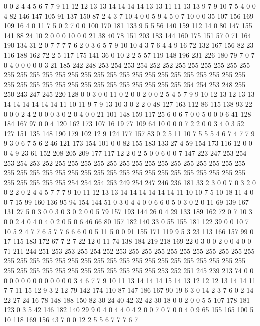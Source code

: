 0 0 2 4 4 5 6 7 7 9 11 12 12 13 13 14 14 14 14 13
13 11 11 13 13 9 7 9 10 7 5 4 0 0 4 82 146 147 105 91
137 150 87 2 4 3 7 10 4 0 0 5 9 4 5 0 7 10 0 0
35 107 156 169 109 16 4 0 11 7 5 0 2 7 0 0 100 170 181 133
9 5 5 56 140 159 112 14 0 80 147 155 141 88 24 10 2 0 0 0
10 0 0 21 38 40 78 151 203 183 144 160 175 151 57 0 71 164 190 134
31 2 0 7 7 7 7 6 2 0 3 6 5 7 9 10 10 4 3 7
6 4 4 9 16 72 132 167 156 82 23 116 188 162 72 2 5 117 175 141
36 0 10 2 2 5 57 119 148 196 231 226 180 79 7 0 7 0 4 0
0 0 0 0 3 21 185 242 248 253 254 253 254 252 252 255 255 255 255 255
255 255 255 255 255 255 255 255 255 255 255 255 255 255 255 255 255 255 255 255
255 255 255 255 255 255 255 255 255 255 255 255 255 255 254 254 253 248 255 250
243 247 245 220 128 0 0 3 0 0 11 0 2 0 0 2 0 0 2 5
4 5 7 9 9 10 12 13 12 13 13 14 14 14 14 14 14 11 10 11
9 7 9 13 10 3 0 2 2 0 48 127 163 112 86 115 138 93 22 0
0 0 2 4 2 0 0 0 3 0 2 0 4 0 0 21 101 148 159 117
25 6 0 6 7 0 0 5 0 0 0 6 41 128 184 167 97 0 0 4
120 162 173 107 16 19 77 109 64 10 0 0 0 7 2 2 0 0 3 4
0 3 52 127 151 135 148 190 179 102 12 9 124 177 157 83 0 2 5 11
10 7 5 5 5 4 6 7 4 7 7 9 9 3 0 6 7 5 6 2
46 121 173 154 101 0 0 82 155 183 133 27 4 59 154 173 116 12 0 0
0 4 9 23 61 152 208 205 209 177 117 12 2 0 2 5 0 0 6 0
0 7 147 223 247 253 254 253 254 253 252 255 255 255 255 255 255 255 255 255
255 255 255 255 255 255 255 255 255 255 255 255 255 255 255 255 255 255 255 255
255 255 255 255 255 255 255 255 255 255 254 254 254 253 249 254 247 246 236 181
33 2 3 0 0 7 0 3 2 0 0 2 2 0 2 4 4 5 7 7
7 9 10 11 12 13 13 14 14 14 14 14 14 11 10 10 7 5 10 18
11 4 0 0 7 15 99 160 136 95 94 154 144 51 0 3 0 4 4 0
0 6 6 0 5 0 3 0 2 0 11 69 139 167 131 27 5 0 3 0
0 3 0 3 0 2 0 0 5 79 157 193 144 26 0 4 29 133 189 162
72 0 7 10 3 0 0 2 4 0 4 0 4 0 2 0 5 0 6 46
66 80 157 182 140 33 0 55 155 181 122 39 0 0 10 7 10 5 2 4
7 7 6 5 7 7 6 6 6 0 0 5 11 5 0 0 91 155 171 119
9 5 3 23 113 166 157 99 0 17 115 183 172 67 7 2 7 22 12 0
11 74 138 184 219 218 169 22 0 3 0 0 2 0 0 4 0 0 71 211
244 251 253 253 255 254 252 253 255 255 255 255 255 255 255 255 255 255 255 255
255 255 255 255 255 255 255 255 255 255 255 255 255 255 255 255 255 255 255 255
255 255 255 255 255 255 255 255 255 253 252 251 245 239 213 74 0 0 0 0
0 0 0 0 0 0 0 0 0 0 3 4 6 7 7 9 10 11 13 14
14 14 15 14 13 12 12 12 13 14 14 11 7 7 11 15 12 9 3 2
12 79 142 174 110 87 147 186 167 90 19 6 3 0 14 2 3 7 6 0
2 14 22 27 24 16 78 148 188 150 82 30 24 40 42 32 42 30 18 0
0 2 0 0 5 5 107 178 181 123 0 3 5 42 146 182 140 29 9 0
4 0 4 4 0 4 2 0 0 7 0 7 0 0 4 0 9 65 155 165
100 5 10 118 169 156 43 7 0 0 12 2 5 5 6 7 7 7 6 7
